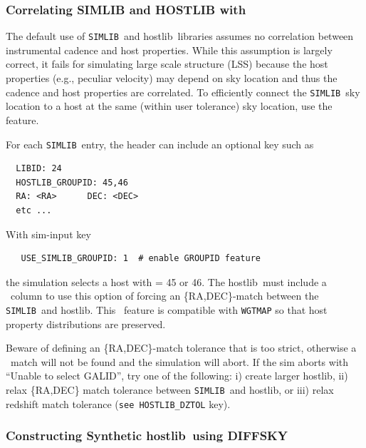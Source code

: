 \documentclass[12pt]{article}
\newcommand{\simlib}{{\tt SIMLIB}}
\newcommand{\hostlib}{{\sc hostlib}}
\begin{document}
{   \subsubsection{Correlating SIMLIB and HOSTLIB with {\groupid} }
   \label{sss:groupid}


The default use of \simlib\ and \hostlib\ libraries assumes no correlation
between instrumental cadence and host properties. While this assumption
is largely correct, it fails for simulating large scale structure (LSS)
because the host properties (e.g., peculiar velocity) may depend on 
sky location and thus the cadence and host properties are correlated.
To efficiently connect the \simlib\ sky location to a host at the 
same (within user tolerance) sky location, 
use the {\groupid} feature.

For each \simlib\ entry, the header can include an optional 
{\groupid} key such as
\begin{verbatim}
  LIBID: 24
  HOSTLIB_GROUPID: 45,46
  RA: <RA>      DEC: <DEC>
  etc ...
\end{verbatim}
%
With sim-input key 
\begin{verbatim}
   USE_SIMLIB_GROUPID: 1  # enable GROUPID feature 
\end{verbatim}
%
the simulation selects a host with {\groupid} = 45 or 46.
The \hostlib\ must include a \groupid\ column to use
this option of forcing an \{RA,DEC\}-match between the 
\simlib\ and \hostlib.
This \groupid\  feature is compatible with {\tt WGTMAP} so
that host property distributions are preserved.

Beware of defining an \{RA,DEC\}-match tolerance that is too strict, 
otherwise a \groupid\  match will not be found and the 
simulation will abort. If the sim aborts with ``Unable to select GALID'',
try one of the following: 
i) create larger \hostlib,
ii) relax \{RA,DEC\} match tolerance between \simlib\ and \hostlib, or
iii) relax redshift match tolerance ({\tt see HOSTLIB\_DZTOL} key).

   \clearpage
\newcommand{\diffsky}{{\tt DIFFSKY}}
\newcommand{\makeDiffsky}{{\tt make\_hostlib\_diffsky.py}}
\newcommand{\msyn}{m_{\rm syn}}

\newcommand{\URLDIFFSKY}{\url{https://diffsky.readthedocs.io/en/latest/demos.html}}

\subsubsection{Constructing Synthetic \hostlib\ using DIFFSKY}
\label{sss:hostlib_diffsky}

}
\end{document}

